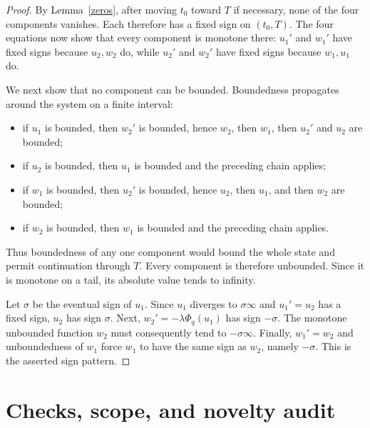 \documentclass[11pt]{article}
\begin{document}
\begin{proof}
By Lemma~\ref{zeros}, after moving $t_0$ toward $T$ if necessary, none of the
four components vanishes.  Each therefore has a fixed sign on $(t_0,T)$.
The four equations now show that every component is monotone there:
$u_1'$ and $w_1'$ have fixed signs because $u_2,w_2$ do, while $u_2'$ and
$w_2'$ have fixed signs because $w_1,u_1$ do.

We next show that no component can be bounded.  Boundedness propagates around
the system on a finite interval:
\begin{itemize}
\item if $u_1$ is bounded, then $w_2'$ is bounded, hence $w_2$, then $w_1$,
  then $u_2'$ and $u_2$ are bounded;
\item if $u_2$ is bounded, then $u_1$ is bounded and the preceding chain
  applies;
\item if $w_1$ is bounded, then $u_2'$ is bounded, hence $u_2$, then $u_1$,
  and then $w_2$ are bounded;
\item if $w_2$ is bounded, then $w_1$ is bounded and the preceding chain
  applies.
\end{itemize}
Thus boundedness of any one component would bound the whole state and permit
continuation through $T$.  Every component is therefore unbounded.  Since it
is monotone on a tail, its absolute value tends to infinity.

Let $\sigma$ be the eventual sign of $u_1$.  Since $u_1$ diverges to
$\sigma\infty$ and $u_1'=u_2$ has a fixed sign, $u_2$ has sign $\sigma$.
Next, $w_2'=-\lambda\Phi_q(u_1)$ has sign $-\sigma$.  The monotone unbounded
function $w_2$ must consequently tend to $-\sigma\infty$.  Finally,
$w_1'=w_2$ and unboundedness of $w_1$ force $w_1$ to have the same sign as
$w_2$, namely $-\sigma$.  This is the asserted sign pattern.
\end{proof}

\section{Checks, scope, and novelty audit}
\end{document}
